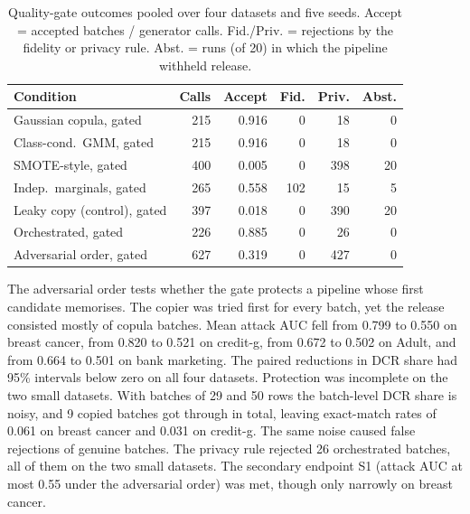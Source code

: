 \documentclass[journal]{IEEEtran}
\begin{document}
\begin{table}[!t]
\caption{Quality-gate outcomes pooled over four datasets and five seeds. Accept = accepted batches / generator calls. Fid./Priv. = rejections by the fidelity or privacy rule. Abst. = runs (of 20) in which the pipeline withheld release.}
\label{tab:gate}
\centering
\footnotesize
\setlength{\tabcolsep}{2.5pt}
\begin{tabular}{lrrrrr}
\toprule
Condition & Calls & Accept & Fid. & Priv. & Abst. \\
\midrule
Gaussian copula, gated & 215 & 0.916 & 0 & 18 & 0 \\
Class-cond.\ GMM, gated & 215 & 0.916 & 0 & 18 & 0 \\
SMOTE-style, gated & 400 & 0.005 & 0 & 398 & 20 \\
Indep.\ marginals, gated & 265 & 0.558 & 102 & 15 & 5 \\
Leaky copy (control), gated & 397 & 0.018 & 0 & 390 & 20 \\
Orchestrated, gated & 226 & 0.885 & 0 & 26 & 0 \\
Adversarial order, gated & 627 & 0.319 & 0 & 427 & 0 \\
\bottomrule
\end{tabular}
\end{table}

The adversarial order tests whether the gate protects a pipeline whose first candidate memorises. The copier was tried first for every batch, yet the release consisted mostly of copula batches. Mean attack AUC fell from 0.799 to 0.550 on breast cancer, from 0.820 to 0.521 on credit-g, from 0.672 to 0.502 on Adult, and from 0.664 to 0.501 on bank marketing. The paired reductions in DCR share had 95\% intervals below zero on all four datasets. Protection was incomplete on the two small datasets. With batches of 29 and 50 rows the batch-level DCR share is noisy, and 9 copied batches got through in total, leaving exact-match rates of 0.061 on breast cancer and 0.031 on credit-g. The same noise caused false rejections of genuine batches. The privacy rule rejected 26 orchestrated batches, all of them on the two small datasets. The secondary endpoint S1 (attack AUC at most 0.55 under the adversarial order) was met, though only narrowly on breast cancer.
\end{document}
